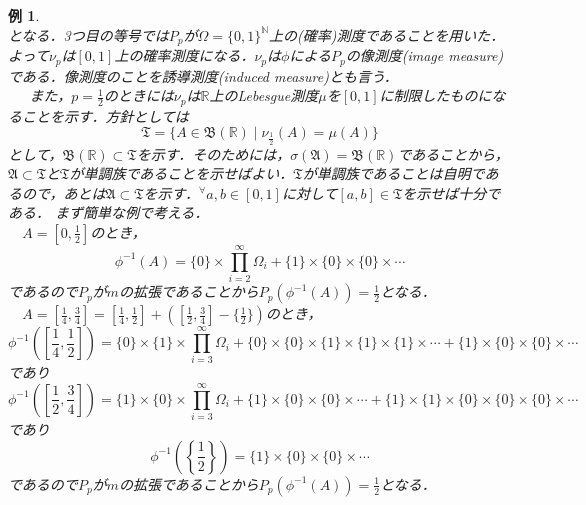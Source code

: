\documentclass[a4paper,11pt]{jsarticle}
\newtheorem{instance}[definition]{例}%
\begin{document}
\begin{instance}
\begin{equation*}
\end{equation*}
となる．3つ目の等号では$P_p$が$\Omega=\{0,1\}^\mathbb{N}$上の(確率)測度であることを用いた．よって$\nu_p$は$[0,1]$上の確率測度になる．$\nu_p$は$\phi$による$P_p$の像測度(image measure)である．像測度のことを誘導測度(induced measure)とも言う．\\
{\ }{\ }{\ }また，$p=\frac{1}{2}$のときには$\nu_p$は$\mathbb{R}$上のLebesgue測度$\mu$を$[0,1]$に制限したものになることを示す．方針としては
\begin{equation*}
\mathfrak{T}=\{A\in\mathfrak{B}(\mathbb{R})\mid \nu_{\frac{1}{2}}(A)=\mu(A)\}
\end{equation*}
として，$\mathfrak{B}(\mathbb{R})\subset\mathfrak{T}$を示す．そのためには，$\sigma(\mathfrak{A})=\mathfrak{B}(\mathbb{R})$であることから，$\mathfrak{A}\subset\mathfrak{T}$と$\mathfrak{T}$が単調族であることを示せばよい．$\mathfrak{T}$が単調族であることは自明であるので，あとは$\mathfrak{A}\subset\mathfrak{T}$を示す．$^\forall a,b\in [0,1]$に対して$[a,b]\in\mathfrak{T}$を示せば十分である．
まず簡単な例で考える．\\
{\ }{\ }$A=\left[0,\frac{1}{2}\right]$のとき，
\begin{equation*}
\phi^{-1}(A)=\{0\}\times\underset{i=2}{\overset{\infty}{\prod}}\Omega_i+\{1\}\times\{0\}\times\{0\}\times\cdots
\end{equation*}
であるので$P_p$が$m$の拡張であることから$P_p(\phi^{-1}(A))=\frac{1}{2}$となる．\\
{\ }{\ }$A=\left[\frac{1}{4},\frac{3}{4}\right]=\left[\frac{1}{4},\frac{1}{2}\right]+\left(\left[\frac{1}{2},\frac{3}{4}\right]-\{\frac{1}{2}\}\right)$のとき，
\begin{equation*}
\phi^{-1}\left(\left[\frac{1}{4},\frac{1}{2}\right]\right)=\{0\}\times\{1\}\times\underset{i=3}{\overset{\infty}{\prod}}\Omega_i+\{0\}\times\{0\}\times\{1\}\times\{1\}\times\{1\}\times\cdots+\{1\}\times\{0\}\times\{0\}\times\cdots
\end{equation*}
であり
\begin{equation*}
\phi^{-1}\left(\left[\frac{1}{2},\frac{3}{4}\right]\right)=\{1\}\times\{0\}\times\underset{i=3}{\overset{\infty}{\prod}}\Omega_i+\{1\}\times\{0\}\times\{0\}\times\cdots+\{1\}\times\{1\}\times\{0\}\times\{0\}\times\{0\}\times\cdots
\end{equation*}
であり
\begin{equation*}
\phi^{-1}\left(\left\{\frac{1}{2}\right\}\right)=\{1\}\times\{0\}\times\{0\}\times\cdots
\end{equation*}
であるので$P_p$が$m$の拡張であることから$P_p(\phi^{-1}(A))=\frac{1}{2}$となる．\\

\end{instance}
\end{document}
